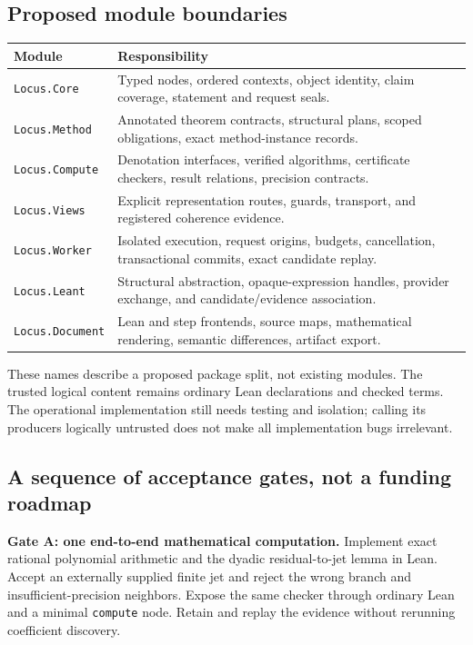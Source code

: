 \documentclass[11pt,letterpaper]{article}
\newcommand{\code}[1]{\nolinkurl{#1}}
\theoremstyle{definition}
\theoremstyle{remark}
\begin{document}
\subsection{Proposed module boundaries}
\begin{tabularx}{\textwidth}{@{}P{.24\textwidth}Y@{}}
\toprule
Module & Responsibility\\
\midrule
\code{Locus.Core} & Typed nodes, ordered contexts, object identity, claim coverage,
statement and request seals.\\
\code{Locus.Method} & Annotated theorem contracts, structural plans, scoped
obligations, exact method-instance records.\\
\code{Locus.Compute} & Denotation interfaces, verified algorithms, certificate
checkers, result relations, precision contracts.\\
\code{Locus.Views} & Explicit representation routes, guards, transport, and
registered coherence evidence.\\
\code{Locus.Worker} & Isolated execution, request origins, budgets, cancellation,
transactional commits, exact candidate replay.\\
\code{Locus.Leant} & Structural abstraction, opaque-expression handles,
provider exchange, and candidate/evidence association.\\
\code{Locus.Document} & Lean and step frontends, source maps, mathematical
rendering, semantic differences, artifact export.\\
\bottomrule
\end{tabularx}
These names describe a proposed package split, not existing modules.
The trusted logical content remains ordinary Lean declarations and checked
terms. The operational implementation still needs testing and isolation;
calling its producers logically untrusted does not make all implementation
bugs irrelevant.

\subsection{A sequence of acceptance gates, not a funding roadmap}
\textbf{Gate A: one end-to-end mathematical computation.}
Implement exact rational polynomial arithmetic and the dyadic residual-to-jet
lemma in Lean. Accept an externally supplied finite jet and reject the wrong
branch and insufficient-precision neighbors. Expose the same checker through
ordinary Lean and a minimal \code{compute} node. Retain and replay the evidence
without rerunning coefficient discovery.
\end{document}
